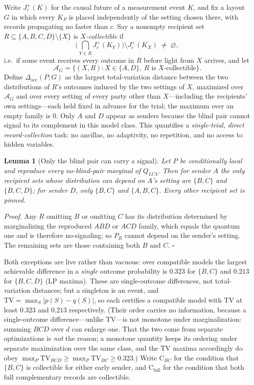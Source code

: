 \documentclass[10pt,twocolumn]{article}
\newtheorem{lemma}{Lemma}
\newcommand{\Dacc}{\Delta_{\mathrm{acc}}}
\newcommand{\CBC}{\mathrm{C}_{BC}}
\newcommand{\CFull}{\mathrm{C}_{\mathrm{full}}}
\begin{document}
Write $J_c^+(K)$ for the causal future of a measurement event $K$, and fix a layout $G$ in which every $K_P$ is placed independently of the setting chosen there, with records propagating no faster than $c$. Say a nonempty recipient set $R\subseteq\{A,B,C,D\}\setminus\{X\}$ is \emph{$X$-collectible} if
\[
\Big(\bigcap_{Y\in R}J_c^+(K_Y)\Big)\setminus J_c^+(K_X)\;\neq\;\varnothing,
\]
i.e.\ if some event receives every outcome in $R$ before light from $X$ arrives, and let
\[
\mathcal A_G=\big\{(X,R): X\in\{A,D\},\ R \text{ is } X\text{-collectible}\big\}.
\]
Define $\Dacc(P;G)$ as the largest total-variation distance between the two distributions of $R$'s outcomes induced by the two settings of $X$, maximized over $\mathcal A_G$ and over every setting of every party other than $X$---including the recipients' own settings---each held fixed in advance for the trial; the maximum over an empty family is $0$. Only $A$ and $D$ appear as senders because the blind pair cannot signal to its complement in this model class. This quantifies a \emph{single-trial, direct record-collection} task: no ancillas, no adaptivity, no repetition, and no access to hidden variables.

\begin{lemma}[Only the blind pair can carry a signal]
\label{lem:pinned}
Let $P$ be conditionally local and reproduce every no-blind-pair marginal of $Q_{LC4}$. Then for sender $A$ the only recipient sets whose distribution can depend on $A$'s setting are $\{B,C\}$ and $\{B,C,D\}$; for sender $D$, only $\{B,C\}$ and $\{A,B,C\}$. Every other recipient set is \emph{pinned}.
\end{lemma}

\noindent\emph{Proof.} Any $R$ omitting $B$ or omitting $C$ has its distribution determined by marginalizing the reproduced $ABD$ or $ACD$ family, which equals the quantum one and is therefore no-signaling; so $P_R$ cannot depend on the sender's setting. The remaining sets are those containing both $B$ and $C$. $\square$

Both exceptions are live rather than vacuous: over compatible models the largest achievable difference in a \emph{single} outcome probability is $0.323$ for $\{B,C\}$ and $0.213$ for $\{B,C,D\}$ (LP maxima). These are single-outcome differences, not total-variation distances; but a singleton is an event, and $\mathrm{TV}=\max_S|p(S)-q(S)|$, so each certifies a compatible model with $\mathrm{TV}$ at least $0.323$ and $0.213$ respectively. (Their order carries no information, because a single-outcome difference---unlike $\mathrm{TV}$---is not monotone under marginalization: summing $BCD$ over $d$ can enlarge one. That the two come from separate optimizations is \emph{not} the reason; a monotone quantity keeps its ordering under separate maximization over the same class, and the $\mathrm{TV}$ maxima accordingly do obey $\max_P\mathrm{TV}_{BCD}\ge\max_P\mathrm{TV}_{BC}\ge0.323$.) Write $\CBC$ for the condition that $\{B,C\}$ is collectible for either early sender, and $\CFull$ for the condition that both full complementary records are collectible.
\end{document}
